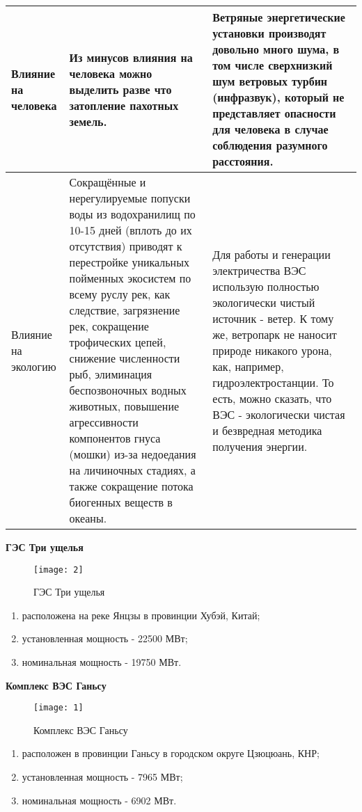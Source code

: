 \newpage
\begin{table}[h!]
	\begin{tabular}{|p{4cm}|p{6cm}|p{6cm}|}
		\hline
		Влияние на человека & Из минусов влияния на человека можно выделить разве что затопление пахотных земель. & Ветряные энергетические установки производят довольно много шума, в том числе сверхнизкий шум ветровых турбин (инфразвук), который не представляет опасности для человека в случае соблюдения разумного расстояния. \\
		\hline
		Влияние на экологию & Сокращённые и нерегулируемые попуски воды из водохранилищ по 10-15 дней (вплоть до их отсутствия) приводят к перестройке уникальных пойменных экосистем по всему руслу рек, как следствие, загрязнение рек, сокращение трофических цепей, снижение численности рыб, элиминация беспозвоночных водных животных,  повышение агрессивности компонентов гнуса (мошки) из-за недоедания на личиночных стадиях, а также сокращение потока биогенных веществ в океаны.& Для работы и генерации электричества ВЭС использую полностью экологически чистый источник - ветер. К тому же, ветропарк не наносит природе никакого урона, как, например, гидроэлектростанции. То есть, можно сказать, что ВЭС - экологически чистая и безвредная методика получения энергии. \\
		\hline
	\end{tabular}
\end{table}

\begin{center}
	\textbf{ГЭС Три ущелья} \end{center}
\begin{figure}[h!]
	\center\texttt{[image: 2]}
	\caption{ГЭС Три ущелья}
\end{figure}
\begin{enumerate}
	\item расположена на реке Янцзы в провинции Хубэй, Китай;
	\item установленная мощность - 	22500 МВт;
	\item номинальная мощность - 19750 МВт.
\end{enumerate}
\newpage
\begin{center}
	\textbf{Комплекс ВЭС Ганьсу} \end{center}
\begin{figure}[h!]
	\center\texttt{[image: 1]}
	\caption{Комплекс ВЭС Ганьсу}
\end{figure}
\begin{enumerate}
	\item расположен в провинции Ганьсу в городском округе Цзюцюань, КНР;
	\item установленная мощность - 7965 МВт;
	\item номинальная мощность - 6902 МВт.
\end{enumerate}

